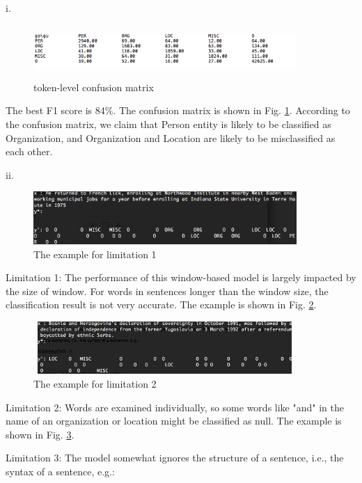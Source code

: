 \documentclass{article}
\theoremstyle{definition}
\theoremstyle{remark}
\numberwithin{equation}{section}
\begin{document}
 i.
 
 \begin{figure}[H] 
  \centering
 \includegraphics[width=100mm, height=20mm]{fig/token-level-confusion.png}
   \caption{token-level confusion matrix}
   \label{fig: confuse}
 \end{figure}
 
 The best F1 score is 84\%. The confusion matrix is shown in Fig. \ref{fig: confuse}. According to the confusion matrix, we claim that Person entity is likely to be classified as Organization, and Organization and Location are likely to be misclassified as each other.
 
 ii.
 
  \begin{figure}[H] 
  \centering
 \includegraphics[width=100mm, height=20mm]{fig/eg1.png}
   \caption{The example for limitation 1}
   \label{fig: eg1}
 \end{figure}
 
 Limitation 1: The performance of this window-based model is largely impacted by the size of window. For words in sentences longer than the window size, the classification result is not very accurate. The example is shown in Fig. \ref{fig: eg1}.
 
 
 \begin{figure}[H] 
  \centering
 \includegraphics[width=100mm, height=20mm]{fig/eg2.png}
   \caption{The example for limitation 2}
   \label{fig: eg2}
 \end{figure}
 
 Limitation 2: Words are examined individually, so some words like "and" in the name of an organization or location might be classified as null. The example is shown in Fig. \ref{fig: eg2}.
 
 Limitation 3: The model somewhat ignores the structure of a sentence, i.e., the syntax of a sentence, e.g.:
 
\end{document}

